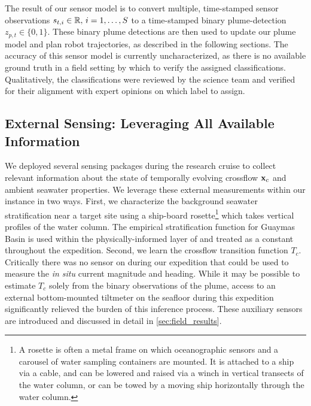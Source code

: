 The result of our sensor model is to convert multiple, time-stamped sensor observations $s_{t, i} \in \mathbb{R}, \, i = 1, \dots, S$ to a time-stamped binary plume-detection $z_{p, t} \in \{0, 1\}$. These binary plume detections are then used to update our plume model and plan robot trajectories, as described in the following sections. The accuracy of this sensor model is currently uncharacterized, as there is no available ground truth in a field setting by which to verify the assigned classifications. Qualitatively, the classifications were reviewed by the science team and verified for their alignment with expert opinions on which label to assign.


\subsection{External Sensing: Leveraging All Available Information}
\label{sec:external_current}
We deployed several sensing packages during the research cruise to collect relevant information about the state of temporally evolving crossflow $\mathbf{x}_c$ and ambient seawater properties. We leverage these external measurements within our \PHUMES instance in two ways. First, we characterize the background seawater stratification near a target site using a ship-board rosette\footnote{A rosette is often a metal frame on which oceanographic sensors and a carousel of water sampling containers are mounted. It is attached to a ship via a cable, and can be lowered and raised via a winch in vertical transects of the water column, or can be towed by a moving ship horizontally through the water column.} which takes vertical profiles of the water column. The empirical stratification function for Guaymas Basin is used within the physically-informed layer of \PHUMES and treated as a constant throughout the expedition. Second, we learn the crossflow transition function $T_c$. Critically there was no sensor on \Sentry during our expedition that could be used to measure the \emph{in situ} current magnitude and heading. While it may be possible to estimate $T_c$ solely from the binary observations of the plume, access to an external bottom-mounted tiltmeter on the seafloor during this expedition significantly relieved the burden of this inference process. These auxiliary sensors are introduced and discussed in detail in \cref{sec:field_results}. 


